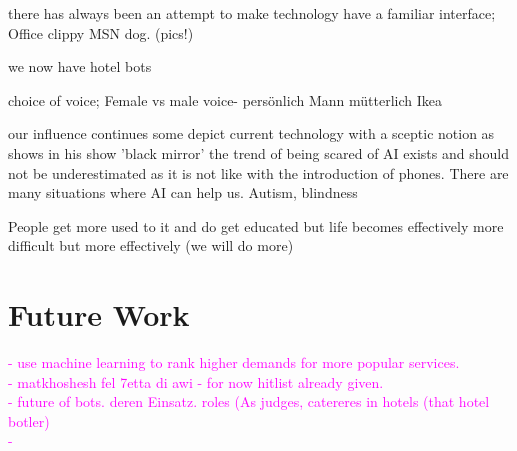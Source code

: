 there has always been an attempt to make technology have a familiar interface;
Office clippy 
MSN dog. 
(pics!)

we now have hotel bots

choice of voice; Female vs male voice- persönlich Mann mütterlich Ikea 


our influence continues 
some depict current technology with a sceptic notion
as ~ shows in his show 'black mirror'
the trend of being scared of AI exists and should not be underestimated as it is not like with the introduction of phones. There are many situations where AI can help us. Autism, blindness


People get more used to it and do get educated but life becomes effectively more difficult but more effectively (we will do more)









\section{Future Work}
\textcolor{magenta}{
- use machine learning to rank higher demands for more popular services.\\ 
- matkhoshesh fel 7etta di awi - for now hitlist already given.\\
- future of bots. deren Einsatz. roles (As judges, catereres in hotels (that hotel botler) \\
-\\
}


